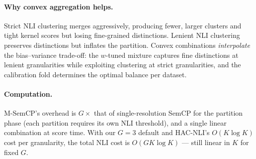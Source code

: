 \paragraph{Why convex aggregation helps.} Strict NLI clustering merges
aggressively, producing fewer, larger clusters and tight kernel scores
but losing fine-grained distinctions. Lenient NLI clustering preserves
distinctions but inflates the partition. Convex combinations
\emph{interpolate} the bias--variance trade-off: the $w$-tuned mixture
captures fine distinctions at lenient granularities while exploiting
clustering at strict granularities, and the calibration fold determines
the optimal balance per dataset.

\paragraph{Computation.} M-SemCP's overhead is $G \times$ that of
single-resolution SemCP for the partition phase (each partition
requires its own NLI threshold), and a single linear combination at
score time. With our $G = 3$ default and HAC-NLI's $O(K \log K)$ cost
per granularity, the total NLI cost is $O(G K \log K)$ — still
linear in $K$ for fixed $G$.
